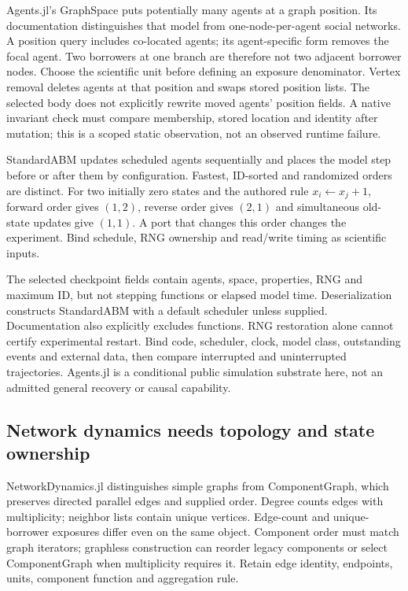 Agents.jl's GraphSpace puts potentially many agents at a graph position. Its
documentation distinguishes that model from one-node-per-agent social
networks. A position query includes co-located agents; its agent-specific form
removes the focal agent. Two borrowers at one branch are therefore not two
adjacent borrower nodes. Choose the scientific unit before defining an exposure
denominator. Vertex removal deletes agents at that position and swaps stored
position lists. The selected body does not explicitly rewrite moved agents'
position fields. A native invariant check must compare membership, stored
location and identity after mutation; this is a scoped static observation,
not an observed runtime failure.\citep{exec25_onet_agents,exec25_onet_choice}

StandardABM updates scheduled agents sequentially and places the model step
before or after them by configuration. Fastest, ID-sorted and randomized
orders are distinct. For two initially zero states and the authored rule
$x_i\leftarrow x_j+1$, forward order gives $(1,2)$, reverse order gives
$(2,1)$ and simultaneous old-state updates give $(1,1)$. A port that changes
this order changes the experiment. Bind schedule, RNG ownership and read/write
timing as scientific inputs.\citep{exec25_onet_agents,exec25_onet_choice}

The selected checkpoint fields contain agents, space, properties, RNG and
maximum ID, but not stepping functions or elapsed model time. Deserialization
constructs StandardABM with a default scheduler unless supplied. Documentation
also explicitly excludes functions. RNG restoration alone cannot certify
experimental restart. Bind code, scheduler, clock, model class, outstanding
events and external data, then compare interrupted and uninterrupted
trajectories. Agents.jl is a conditional public simulation substrate here,
not an admitted general recovery or causal capability.
\citep{exec25_onet_agents,exec25_onet_choice}

\subsection{Network dynamics needs topology and state ownership}

NetworkDynamics.jl distinguishes simple graphs from ComponentGraph, which
preserves directed parallel edges and supplied order. Degree counts edges
with multiplicity; neighbor lists contain unique vertices. Edge-count and
unique-borrower exposures differ even on the same object. Component order
must match graph iterators; graphless construction can reorder legacy
components or select ComponentGraph when multiplicity requires it. Retain
edge identity, endpoints, units, component function and aggregation rule.
\citep{exec25_onet_dynamics}

